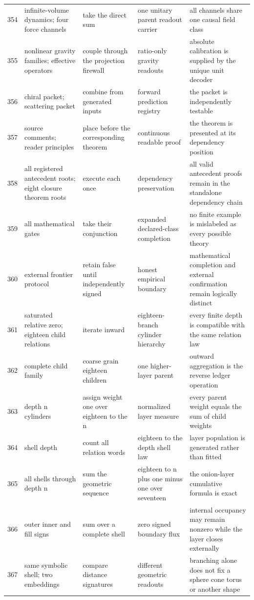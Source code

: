 \documentclass[11pt]{article}
\numberwithin{equation}{section}
\theoremstyle{remark}
\begin{document}
\begin{landscape}
\begin{longtable}{p{0.65cm}p{3.5cm}p{4.0cm}p{4.0cm}p{4.6cm}}
354&infinite-volume dynamics; four force channels&take the direct sum&one unitary parent readout carrier&all channels share one causal field class\\
355&nonlinear gravity families; effective operators&couple through the projection firewall&ratio-only gravity readouts&absolute calibration is supplied by the unique unit decoder\\
356&chiral packet; scattering packet&combine from generated inputs&forward prediction registry&the packet is independently testable\\
357&source comments; reader principles&place before the corresponding theorem&continuous readable proof&the theorem is presented at its dependency position\\
358&all registered antecedent roots; eight closure theorem roots&execute each once&dependency preservation&all valid antecedent proofs remain in the standalone dependency chain\\
359&all mathematical gates&take their conjunction&expanded declared-class completion&no finite example is mislabeled as every possible theory\\
360&external frontier protocol&retain false until independently signed&honest empirical boundary&mathematical completion and external confirmation remain logically distinct\\
361&saturated relative zero; eighteen child relations&iterate inward&eighteen-branch cylinder hierarchy&every finite depth is compatible with the same relation law\\
362&complete child family&coarse grain eighteen children&one higher-layer parent&outward aggregation is the reverse ledger operation\\
363&depth n cylinders&assign weight one over eighteen to the n&normalized layer measure&every parent weight equals the sum of child weights\\
364&shell depth&count all relation words&eighteen to the depth shell law&layer population is generated rather than fitted\\
365&all shells through depth n&sum the geometric sequence&eighteen to n plus one minus one over seventeen&the onion-layer cumulative formula is exact\\
366&outer inner and fill signs&sum over a complete shell&zero signed boundary flux&internal occupancy may remain nonzero while the layer closes externally\\
367&same symbolic shell; two embeddings&compare distance signatures&different geometric readouts&branching alone does not fix a sphere cone torus or another shape\\

\end{longtable}
\end{landscape}
\end{document}
